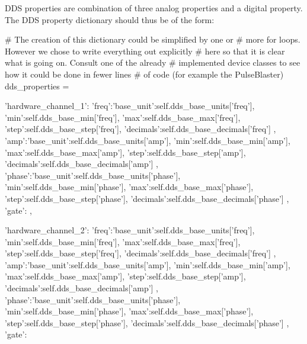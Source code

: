 \documentclass[12pt]{article}
\begin{document}
DDS properties are combination of three analog properties and a digital property.
The DDS property dictionary should thus be of the form:
\begin{python}
    # The creation of this dictionary could be simplified by one or
    # more for loops. However we chose to write everything out explicitly
    # here so that it is clear what is going on. Consult one of the already 
    # implemented device classes to see how it could be done in fewer lines
    # of code (for example the PulseBlaster)
    dds_properties = {'hardware_channel_1':
                           {'freq':{'base_unit':self.dds_base_units['freq'],
                                    'min':self.dds_base_min['freq'],
                                    'max':self.dds_base_max['freq'],
                                    'step':self.dds_base_step['freq'],
                                    'decimals':self.dds_base_decimals['freq']
                                   },
                             'amp':{'base_unit':self.dds_base_units['amp'],
                                    'min':self.dds_base_min['amp'],
                                    'max':self.dds_base_max['amp'],
                                    'step':self.dds_base_step['amp'],
                                    'decimals':self.dds_base_decimals['amp']
                                   },
												  'phase':{'base_unit':self.dds_base_units['phase'],
                                    'min':self.dds_base_min['phase'],
                                    'max':self.dds_base_max['phase'],
                                    'step':self.dds_base_step['phase'],
                                    'decimals':self.dds_base_decimals['phase']
                                   },
                            'gate':{}
                            },

                      'hardware_channel_2':
                           {'freq':{'base_unit':self.dds_base_units['freq'],
                                    'min':self.dds_base_min['freq'],
                                    'max':self.dds_base_max['freq'],
                                    'step':self.dds_base_step['freq'],
                                    'decimals':self.dds_base_decimals['freq']
                                   },
                             'amp':{'base_unit':self.dds_base_units['amp'],
                                    'min':self.dds_base_min['amp'],
                                    'max':self.dds_base_max['amp'],
                                    'step':self.dds_base_step['amp'],
                                    'decimals':self.dds_base_decimals['amp']
                                   },
												  'phase':{'base_unit':self.dds_base_units['phase'],
                                    'min':self.dds_base_min['phase'],
                                    'max':self.dds_base_max['phase'],
                                    'step':self.dds_base_step['phase'],
                                    'decimals':self.dds_base_decimals['phase']
                                   },
                            'gate':{}
                            }
                     }
\end{python}
\end{document}
